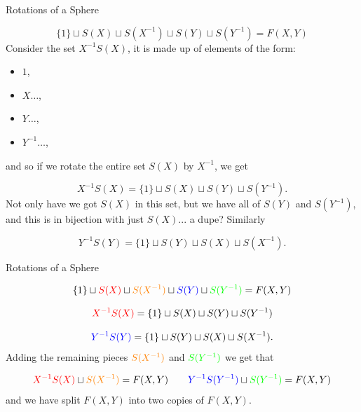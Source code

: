 \documentclass[9pt]{beamer}
\begin{document}
    \begin{frame}{Rotations of a Sphere}

        \[\{1\}\sqcup S(X)\sqcup S(X^{-1})\sqcup S(Y)\sqcup S(Y^{-1})=F(X, Y)\]
        Consider the set $X^{-1}S(X)$, it is made up of elements of the form:

        \begin{itemize}
            \item $1$,
            \item $X\dots$,
            \item $Y\dots$,
            \item $Y^{-1}\dots$,
        \end{itemize}
        and so if we rotate the entire set $S(X)$ by $X^{-1}$, we get

        \[X^{-1}S(X)=\{1\}\sqcup S(X)\sqcup S(Y)\sqcup S(Y^{-1}).\]\pause
        Not only have we got $S(X)$ in this set, but we have all of $S(Y)$ and $S(Y^{-1})$, and this is in bijection with just $S(X)$... a dupe? \pause
        Similarly

        \[Y^{-1}S(Y)=\{1\}\sqcup S(Y)\sqcup S(X)\sqcup S(X^{-1}).\]
        
    \end{frame}

    \begin{frame}{Rotations of a Sphere}

        \[\{1\}\sqcup \textcolor{red}{S(X)}\sqcup\textcolor{orange}{S(X^{-1})}\sqcup\textcolor{blue}{S(Y)}\sqcup \textcolor{green}{S(Y^{-1})}=F(X, Y)\]

        \[\textcolor{red}{X^{-1}S(X)}=\{1\}\sqcup S(X)\sqcup S(Y)\sqcup S(Y^{-1})\]

        \[\textcolor{blue}{Y^{-1}S(Y)}=\{1\}\sqcup S(Y)\sqcup S(X)\sqcup S(X^{-1}).\]\pause
        Adding the remaining pieces $\textcolor{orange}{S(X^{-1})}$ and $\textcolor{green}{S(Y^{-1})}$ we get that

        \[\textcolor{red}{X^{-1}S(X)}\sqcup\textcolor{orange}{S(X^{-1})}=F(X, Y)\quad\quad\textcolor{blue}{Y^{-1} S(Y^{-1})}\sqcup\textcolor{green}{S(Y^{-1})}=F(X, Y)\]\pause
        and we have split $F(X, Y)$ into two copies of $F(X, Y)$.
        
    \end{frame}
\end{document}
